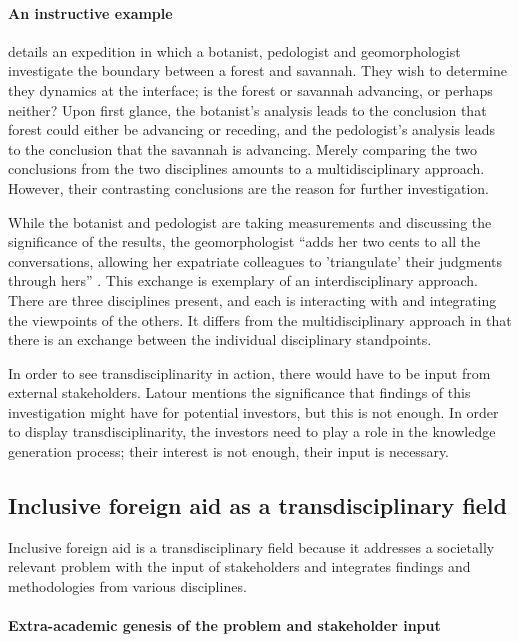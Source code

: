 \documentclass[a4paper]{article}
\begin{document}
\paragraph{An instructive example}

\cite{latour1999circulating} details an expedition in which a botanist,
pedologist and geomorphologist investigate the boundary between a forest and
savannah. They wish to determine they dynamics at the interface; is the forest
or savannah advancing, or perhaps neither? Upon first glance, the botanist's
analysis leads to the conclusion that forest could either be advancing or
receding, and the pedologist's analysis leads to the conclusion that the
savannah is advancing. Merely comparing the two conclusions from the two
disciplines amounts to a multidisciplinary approach. However, their
contrasting conclusions are the reason for further investigation.

While the botanist and pedologist are taking measurements and discussing the
significance of the results, the geomorphologist ``adds her two cents to all
the conversations, allowing her expatriate colleagues to 'triangulate' their
judgments through hers'' \citep{latour1999circulating}. This exchange is
exemplary of an interdisciplinary approach. There are three disciplines
present, and each is interacting with and integrating the viewpoints of the
others. It differs from the multidisciplinary approach in that there is an
exchange between the individual disciplinary standpoints.

In order to see transdisciplinarity in action, there would have to be input
from external stakeholders. Latour mentions the significance that findings of
this investigation might have for potential investors, but this is not enough.
In order to display transdisciplinarity, the investors need to play a role in
the knowledge generation process; their interest is not enough, their input is
necessary.

\subsection{Inclusive foreign aid as a transdisciplinary field}

Inclusive foreign aid is a transdisciplinary field because it addresses a
societally relevant problem with the input of stakeholders and integrates
findings and methodologies from various disciplines.

\paragraph{Extra-academic genesis of the problem and stakeholder input}
\end{document}
